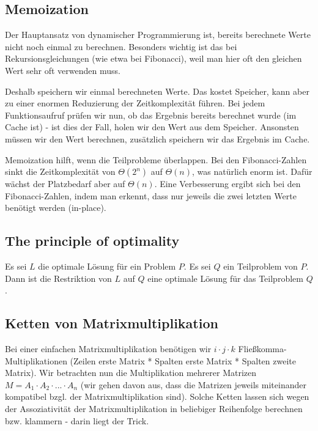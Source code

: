 \documentclass[12pt]{article}
\begin{document}
\subsection{Memoization}

Der Hauptansatz von dynamischer Programmierung ist, bereits berechnete Werte nicht noch einmal zu berechnen. Besonders wichtig ist das bei Rekursionsgleichungen (wie etwa bei Fibonacci), weil man hier oft den gleichen Wert sehr oft verwenden muss.

Deshalb speichern wir einmal berechneten Werte. Das kostet Speicher, kann aber zu einer enormen Reduzierung der Zeitkomplexität führen. Bei jedem Funktionsaufruf prüfen wir nun, ob das Ergebnis bereits berechnet wurde (im Cache ist) - ist dies der Fall, holen wir den Wert aus dem Speicher. Ansonsten müssen wir den Wert berechnen, zusätzlich speichern wir das Ergebnis im Cache.

Memoization hilft, wenn die Teilprobleme überlappen. Bei den Fibonacci-Zahlen sinkt die Zeitkomplexität von $\Theta(2^n)$ auf $\Theta(n)$, was natürlich enorm ist. Dafür wächst der Platzbedarf aber auf $\Theta(n)$. Eine Verbesserung ergibt sich bei den Fibonacci-Zahlen, indem man erkennt, dass nur jeweils die zwei letzten Werte benötigt werden (in-place).

\subsection{The principle of optimality}

Es sei $L$ die optimale Lösung für ein Problem $P$. Es sei $Q$ ein Teilproblem von $P$. Dann ist die Restriktion von $L$ auf $Q$ eine optimale Lösung für das Teilproblem $Q$.

\subsection{Ketten von Matrixmultiplikation}

Bei einer einfachen Matrixmultiplikation benötigen wir $i \cdot j \cdot k$ Fließkomma-Multiplikationen (Zeilen erste Matrix * Spalten erste Matrix * Spalten zweite Matrix). Wir betrachten nun die Multiplikation mehrerer Matrizen $M = A_1 \cdot A_2 \cdot ... \cdot A_n$ (wir gehen davon aus, dass die Matrizen jeweils miteinander kompatibel bzgl. der Matrixmultiplikation sind). Solche Ketten lassen sich wegen der Assoziativität der Matrixmultiplikation in beliebiger Reihenfolge berechnen bzw. klammern - darin liegt der Trick.
\end{document}
